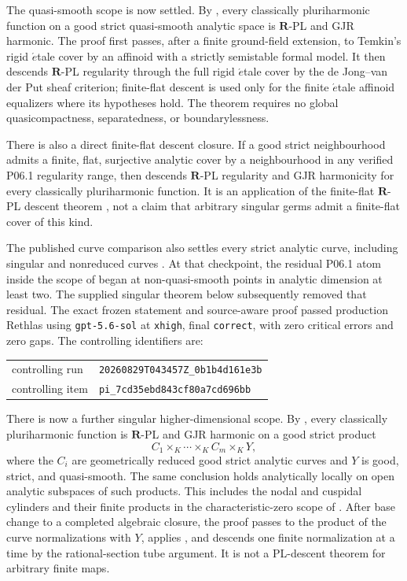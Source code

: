 The quasi-smooth scope is now settled.  By
, every classically pluriharmonic function
on a good strict quasi-smooth analytic space is \(\mathbf R\)-PL and GJR
harmonic.  The proof first passes, after a finite ground-field extension, to
Temkin's rigid \(\acute{e}\)tale cover by an affinoid with a strictly
semistable formal model.  It then descends \(\mathbf R\)-PL regularity through
the full rigid \(\acute{e}\)tale cover by the de Jong--van der Put sheaf
criterion; finite-flat descent is used only for the finite
\(\acute{e}\)tale affinoid equalizers where its hypotheses hold.  The theorem
requires no global quasicompactness, separatedness, or boundarylessness.

There is also a direct finite-flat descent closure.  If a good strict
neighbourhood admits a finite, flat, surjective analytic cover by a
neighbourhood in any verified P06.1 regularity range, then
 descends \(\mathbf R\)-PL
regularity and GJR harmonicity for every classically pluriharmonic function.
It is an application of the finite-flat \(\mathbf R\)-PL descent theorem
\cite[Proposition~5.11]{GJR26}, not a claim that arbitrary singular germs
admit a finite-flat cover of this kind.

The published curve comparison also settles every strict analytic curve,
including singular and nonreduced curves
\cite[\S4.1.2 and Proposition~3.15]{GR25Classical}.  At that checkpoint, the residual P06.1 atom inside the scope of
 began at non-quasi-smooth points in
analytic dimension at least two.  The supplied singular theorem below
subsequently removed that residual.  The exact frozen
statement and source-aware proof passed production Rethlas using
\texttt{gpt-5.6-sol} at \texttt{xhigh}, final \texttt{correct}, with zero
critical errors and zero gaps.  The controlling identifiers are:
\begin{center}
\small
\begin{tabular}{@{}ll@{}}
controlling run & \nolinkurl{20260829T043457Z_0b1b4d161e3b}\\
controlling item & \nolinkurl{pi_7cd35ebd843cf80a7cd696bb}
\end{tabular}
\end{center}

There is now a further singular higher-dimensional scope.  By
, every classically pluriharmonic
function is \(\mathbf R\)-PL and GJR harmonic on a good strict product
\[
             C_1\times_K\cdots\times_K C_m\times_K Y,
\]
where the \(C_i\) are geometrically reduced good strict analytic curves and
\(Y\) is good, strict, and quasi-smooth.  The same conclusion holds
analytically locally on open analytic subspaces of such products.  This
includes the nodal and cuspidal cylinders and their finite products in the
characteristic-zero scope of .
After base change to a completed algebraic closure, the proof passes to the
product of the curve normalizations with \(Y\), applies
, and descends one finite normalization at
a time by the rational-section tube argument.  It is not a PL-descent
theorem for arbitrary finite maps.

